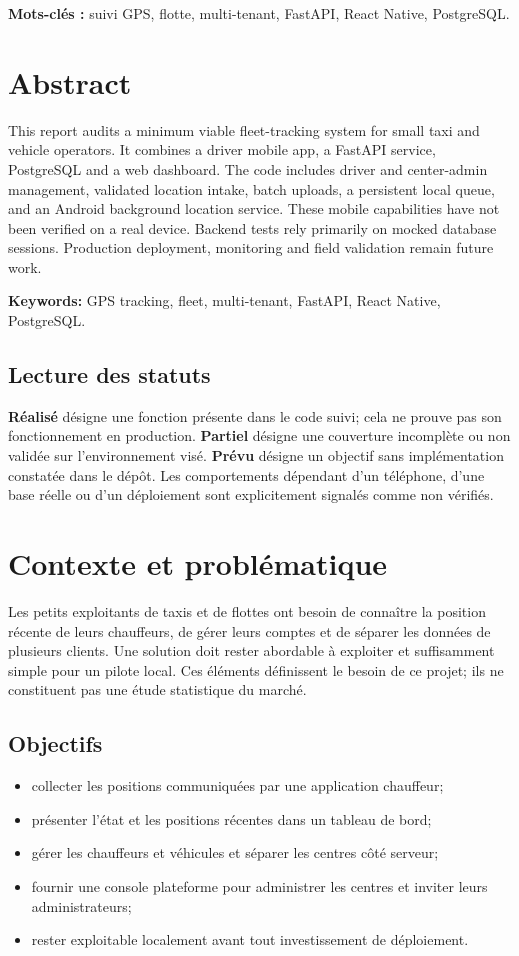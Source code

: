\documentclass[12pt,a4paper]{article}
\begin{document}
\textbf{Mots-clés :} suivi GPS, flotte, multi-tenant, FastAPI, React Native, PostgreSQL.

\section*{Abstract}
This report audits a minimum viable fleet-tracking system for small taxi and vehicle operators. It combines a driver mobile app, a FastAPI service, PostgreSQL and a web dashboard. The code includes driver and center-admin management, validated location intake, batch uploads, a persistent local queue, and an Android background location service. These mobile capabilities have not been verified on a real device. Backend tests rely primarily on mocked database sessions. Production deployment, monitoring and field validation remain future work.

\textbf{Keywords:} GPS tracking, fleet, multi-tenant, FastAPI, React Native, PostgreSQL.

\tableofcontents
\clearpage
{}

\subsection*{Lecture des statuts}
\textbf{Réalisé} désigne une fonction présente dans le code suivi; cela ne prouve pas son fonctionnement en production. \textbf{Partiel} désigne une couverture incomplète ou non validée sur l'environnement visé. \textbf{Prévu} désigne un objectif sans implémentation constatée dans le dépôt. Les comportements dépendant d'un téléphone, d'une base réelle ou d'un déploiement sont explicitement signalés comme non vérifiés.

\section{Contexte et problématique}

Les petits exploitants de taxis et de flottes ont besoin de connaître la position récente de leurs chauffeurs, de gérer leurs comptes et de séparer les données de plusieurs clients. Une solution doit rester abordable à exploiter et suffisamment simple pour un pilote local. Ces éléments définissent le besoin de ce projet; ils ne constituent pas une étude statistique du marché.

\subsection{Objectifs}
\begin{itemize}
\item collecter les positions communiquées par une application chauffeur;
\item présenter l'état et les positions récentes dans un tableau de bord;
\item gérer les chauffeurs et véhicules et séparer les centres côté serveur;
\item fournir une console plateforme pour administrer les centres et inviter leurs administrateurs;
\item rester exploitable localement avant tout investissement de déploiement.
\end{itemize}
\end{document}
